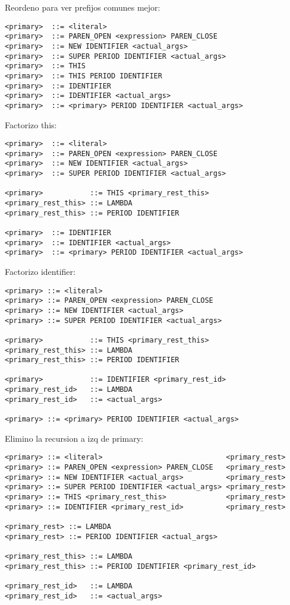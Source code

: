 \documentclass [a4paper,titlepage]{report}
\begin{document}
Reordeno para ver prefijos comunes mejor:
\begin{verbatim}
<primary>  ::= <literal>
<primary>  ::= PAREN_OPEN <expression> PAREN_CLOSE
<primary>  ::= NEW IDENTIFIER <actual_args>
<primary>  ::= SUPER PERIOD IDENTIFIER <actual_args>
<primary>  ::= THIS
<primary>  ::= THIS PERIOD IDENTIFIER
<primary>  ::= IDENTIFIER
<primary>  ::= IDENTIFIER <actual_args>
<primary>  ::= <primary> PERIOD IDENTIFIER <actual_args>
\end{verbatim}

Factorizo this:
\begin{verbatim}
<primary>  ::= <literal>
<primary>  ::= PAREN_OPEN <expression> PAREN_CLOSE
<primary>  ::= NEW IDENTIFIER <actual_args>
<primary>  ::= SUPER PERIOD IDENTIFIER <actual_args>

<primary>           ::= THIS <primary_rest_this>
<primary_rest_this> ::= LAMBDA
<primary_rest_this> ::= PERIOD IDENTIFIER

<primary>  ::= IDENTIFIER
<primary>  ::= IDENTIFIER <actual_args>
<primary>  ::= <primary> PERIOD IDENTIFIER <actual_args>
\end{verbatim}

Factorizo identifier: 
\begin{verbatim}
<primary> ::= <literal>
<primary> ::= PAREN_OPEN <expression> PAREN_CLOSE
<primary> ::= NEW IDENTIFIER <actual_args>
<primary> ::= SUPER PERIOD IDENTIFIER <actual_args>

<primary>           ::= THIS <primary_rest_this>
<primary_rest_this> ::= LAMBDA
<primary_rest_this> ::= PERIOD IDENTIFIER

<primary>           ::= IDENTIFIER <primary_rest_id>
<primary_rest_id>   ::= LAMBDA
<primary_rest_id>   ::= <actual_args>

<primary> ::= <primary> PERIOD IDENTIFIER <actual_args>
\end{verbatim}

Elimino la recursion a izq de primary:
\begin{verbatim}
<primary> ::= <literal>                             <primary_rest>
<primary> ::= PAREN_OPEN <expression> PAREN_CLOSE   <primary_rest>
<primary> ::= NEW IDENTIFIER <actual_args>          <primary_rest>
<primary> ::= SUPER PERIOD IDENTIFIER <actual_args> <primary_rest>
<primary> ::= THIS <primary_rest_this>              <primary_rest>
<primary> ::= IDENTIFIER <primary_rest_id>          <primary_rest>

<primary_rest> ::= LAMBDA
<primary_rest> ::= PERIOD IDENTIFIER <actual_args>

<primary_rest_this> ::= LAMBDA
<primary_rest_this> ::= PERIOD IDENTIFIER <primary_rest_id>

<primary_rest_id>   ::= LAMBDA
<primary_rest_id>   ::= <actual_args>
\end{verbatim}
\end{document}
